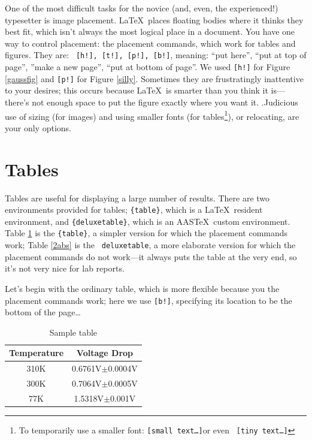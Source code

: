 \documentclass[preprint]{aastex}
\begin{document}
	One of the most difficult tasks for the novice (and, even, the
experienced!) typesetter is image placement.  \LaTeX\ places floating
bodies where it thinks they best fit, which isn't always the most
logical place in a document. You have one way to control placement: the
placement commands, which work for tables and figures. They are: {\tt
[h!], [t!], [p!], [b!]}, meaning: ``put here'', ``put at top of page'',
''make a new page'', ``put at bottom of page''. We used {\tt [h!]} for
Figure \ref{gaussfig} and {\tt [p!]} for Figure \ref{silly}. Sometimes
they are frustratingly inattentive to your desires; this occurs because
\LaTeX\ is smarter than you think it is---there's not enough space to
put the figure exactly where you want it. .Judicious use of sizing (for
images) and using smaller fonts (for tables\footnote{To temporarily use
a smaller font: {\tt {\small [small text\dots]}}or even {\tt {\tiny
[tiny text\dots]}}}), or relocating, are your only options.

\section{Tables}\label{tablesec}

        Tables are useful for displaying a large number of results.
There are two environments provided for tables; \verb&{table}&, which is
a \LaTeX\ resident environment, and \verb&{deluxetable}&, which is an
AAS\TeX\ custom environment.   Table \ref{normtable} is the {\tt \{table\}}, a simpler
version for which the placement commands work; Table \ref{2abs} is the {\tt
deluxetable}, a more elaborate version for which the placement commands
do not work---it always puts the table at the very end, so it's not very
nice for lab reports.

\noindent Let's begin with the ordinary table, which is more flexible
because you the placement commands work; here we use {\tt [b!]},
specifying its location to be the bottom of the page\dots

\begin{table}[!b]
\begin{center}
\caption{Sample table \label{normtable}}
\begin{tabular}{|c|c|} \hline
Temperature & Voltage Drop \\
\hline
\hline
310K & 0.6761V$\pm$0.0004V\\
\hline
300K & 0.7064V$\pm$0.0005V\\
\hline
77K & 1.5318V$\pm$0.001V\\
\hline
\end{tabular}
\end{center}
\end{table}
\end{document}
